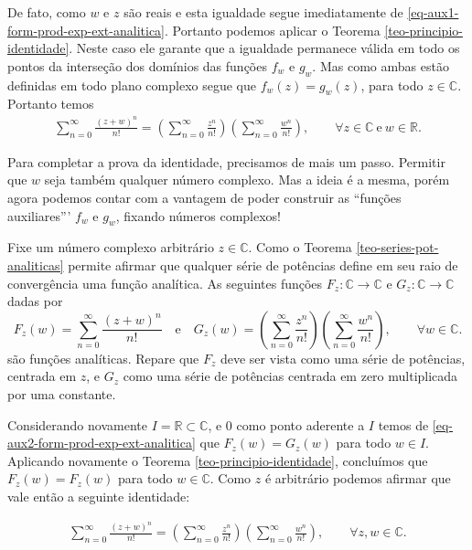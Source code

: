 \begin{exemplo}
De fato, como $w$ e $z$ são reais e esta igualdade segue imediatamente
de \eqref{eq-aux1-form-prod-exp-ext-analitica}.
Portanto podemos aplicar o  Teorema \ref{teo-principio-identidade}. 
Neste caso ele garante que a igualdade
permanece válida em todo os pontos da interseção dos domínios das funções $f_{w}$ e 
$g_{w}$. Mas como ambas estão definidas em todo plano complexo segue que
$f_{w}(z)=g_{w}(z)$, para todo $z\in \mathbb{C}$. Portanto temos
\begin{align}\label{eq-aux2-form-prod-exp-ext-analitica}
\sum_{n=0}^{\infty} \frac{(z+w)^n }{n!}
=
\left( \sum_{n=0}^{\infty} \frac{z^n}{n!} \right)
\left( \sum_{n=0}^{\infty} \frac{w^n}{n!} \right),
\qquad \forall z\in\mathbb{C} \ \text{e}\ w\in\mathbb{R}.
\end{align}

Para completar a prova da identidade, 
precisamos de mais um passo. Permitir que $w$ seja também
qualquer número complexo. Mas a ideia é a mesma, porém 
agora podemos contar com a vantagem de poder construir as ``funções auxiliares'''
$f_{w}$ e $g_{w}$, fixando números complexos! 

\medskip 

Fixe um número complexo arbitrário $z\in \mathbb{C}$. 
Como o Teorema \ref{teo-series-pot-analiticas}
permite afirmar que qualquer série de potências define em seu raio de convergência
uma função analítica. As seguintes 
funções $F_{z}:\mathbb{C}\to\mathbb{C}$ 
e $G_{z}:\mathbb{C}\to\mathbb{C}$ dadas por 
\[
F_z(w) = \sum_{n=0}^{\infty} \frac{(z+w)^n }{n!}
\quad\text{e}\quad
G_z(w) = 
\left( \sum_{n=0}^{\infty} \frac{z^n}{n!} \right)
\left( \sum_{n=0}^{\infty} \frac{w^n}{n!} \right),
\qquad \forall w\in\mathbb{C}.
\]
são funções analíticas. Repare que $F_z$ deve ser vista como uma série de potências, centrada em $z$, e $G_{z}$ como uma série de potências centrada em zero multiplicada
por uma constante. 


Considerando novamente $I=\mathbb{R}\subset \mathbb{C}$, 
e $0$ como ponto aderente a $I$ temos de 
\eqref{eq-aux2-form-prod-exp-ext-analitica} que 
$
F_{z}(w)=G_{z}(w)
$
para todo $w\in I$. 
Aplicando novamente o Teorema \ref{teo-principio-identidade},
concluímos que $F_{z}(w)=F_{z}(w)$ para todo $w\in\mathbb{C}$. 
Como $z$ é arbitrário podemos afirmar que vale então a seguinte
identidade: 

\begin{align}\label{eq-aux3-form-prod-exp-ext-analitica}
\sum_{n=0}^{\infty} \frac{(z+w)^n }{n!}
=
\left( \sum_{n=0}^{\infty} \frac{z^n}{n!} \right)
\left( \sum_{n=0}^{\infty} \frac{w^n}{n!} \right),
\qquad \forall z,w\in\mathbb{C}.
\end{align}







\end{exemplo}
